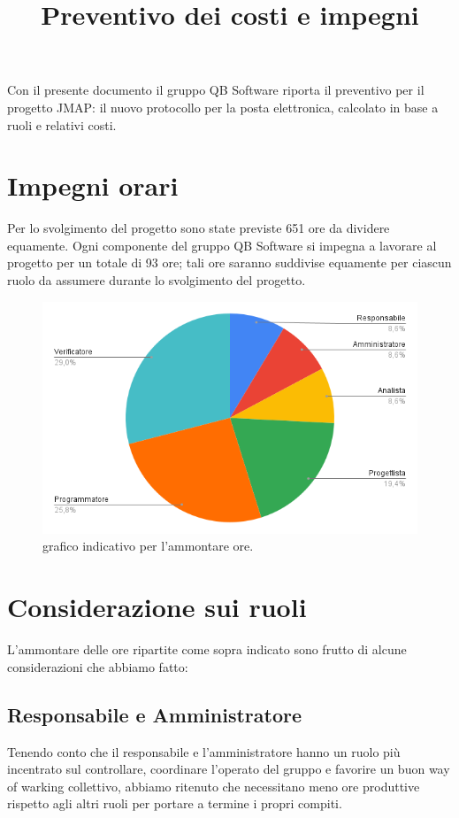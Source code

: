 \documentclass[12pt]{article}
\title{Preventivo dei costi e impegni}
\begin{document}
	\makefirstpage
	
	
	\clearpage
	
	\tableofcontents
	\clearpage
	
	\noindent Con il presente documento il gruppo QB Software riporta il preventivo per il progetto JMAP: il nuovo protocollo per la posta elettronica, calcolato in base a ruoli e relativi costi.
	
	\section{Impegni orari}
	Per lo svolgimento del progetto sono state previste 651 ore da dividere equamente. Ogni componente del gruppo QB Software si impegna a lavorare al progetto per un totale di 93 ore; tali ore saranno suddivise equamente per ciascun ruolo da assumere durante lo svolgimento del progetto.
	
	\begin{figure}[h]
		\centering
		\includegraphics[scale=.6]{imgs/chart.png}
		\caption{grafico indicativo per l'ammontare ore.}
		\label{fig:enter-label}
	\end{figure}
	\clearpage
	
	\section{Considerazione sui ruoli} \label{sec:considerazioni}
	L'ammontare delle ore ripartite come sopra indicato sono frutto di alcune considerazioni che abbiamo fatto:
	
	\subsection{Responsabile e Amministratore}
	Tenendo conto che il responsabile e l'amministratore hanno un ruolo più incentrato sul controllare, coordinare l'operato del gruppo e favorire un buon way of warking collettivo, abbiamo ritenuto che necessitano meno ore produttive rispetto agli altri ruoli per portare a termine i propri compiti.
	
\end{document}
